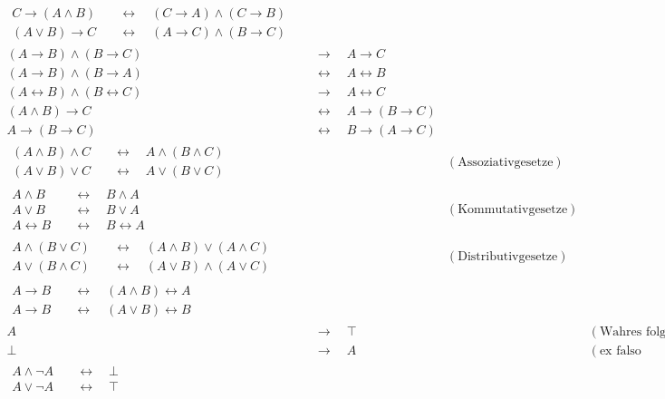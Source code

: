 \begin{align*}
    \begin{split}
        C\to (A\land B) & \quad\leftrightarrow\quad (C\to A) \land (C\to B) \\
        (A\lor B) \to C & \quad\leftrightarrow\quad (A\to C) \land (B\to C)
    \end{split} \\[1em]
    (A \to B) \land (B \to C) & \quad \to\quad A \to C \\ 
    (A \to B) \land (B \to A) & \quad\leftrightarrow\quad A \leftrightarrow B \\
    (A\leftrightarrow B)\land (B\leftrightarrow C) & \quad \to\quad A\leftrightarrow C \\[1em]
    (A \land B) \to C & \quad\leftrightarrow\quad A \to (B \to C) \\
    A \to (B \to C) & \quad\leftrightarrow\quad  B \to (A \to C) \\[1em]
    \begin{split}
        (A \land B) \land C & \quad\leftrightarrow\quad A \land (B \land C) \\
        (A \lor B) \lor C & \quad\leftrightarrow\quad  A \lor (B \lor C)
    \end{split} && (\text{Assoziativgesetze}) \\[1em]
    \begin{split}
        A \land B & \quad\leftrightarrow\quad  B \land A \\
        A \lor B & \quad\leftrightarrow\quad  B \lor A \\
        A\leftrightarrow B &\quad\leftrightarrow\quad  B \leftrightarrow A
    \end{split} && ( \text{Kommutativgesetze}) \\[1em]
    \begin{split} A \land (B \lor C) & \quad\leftrightarrow\quad  (A \land B) \lor (A \land C) \\
        A \lor (B \land C) & \quad\leftrightarrow\quad  (A \lor B) \land (A \lor C)
    \end{split} && ( \text{Distributivgesetze}) \\[1em]
    \begin{split}
        A \to B & \quad\leftrightarrow\quad (A \land B) \leftrightarrow A \\
        A \to B & \quad\leftrightarrow\quad (A \lor B) \leftrightarrow B
    \end{split} \\[1em]
    A & \quad\to\quad \top && (\text{Wahres folgt aus Beliebigem}) \\
    \bot & \quad\to\quad A && (\text{ex falso quodlibet}) \\[1em]
    \begin{split}
        A \land \neg A & \quad\leftrightarrow\quad \bot \\
        A \lor \neg A & \quad\leftrightarrow\quad \top
    \end{split} \\[-2em]
\end{align*}
